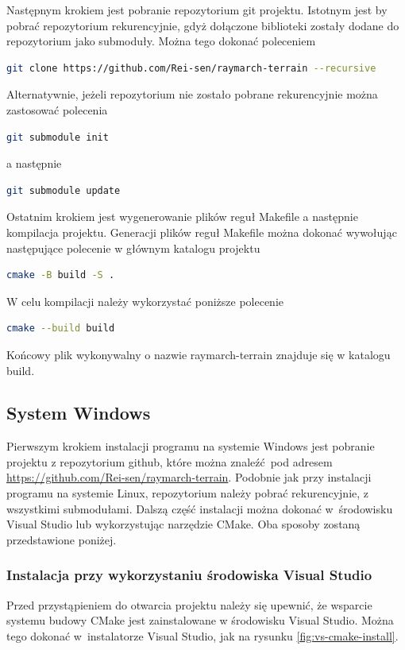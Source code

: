 Następnym krokiem jest pobranie repozytorium git projektu. Istotnym jest by pobrać repozytorium rekurencyjnie, gdyż dołączone biblioteki zostały dodane do repozytorium jako submoduły. Można tego dokonać poleceniem
\begin{lstlisting}[language=bash]
  git clone https://github.com/Rei-sen/raymarch-terrain --recursive
\end{lstlisting}
Alternatywnie, jeżeli repozytorium nie zostało pobrane rekurencyjnie można zastosować polecenia
\begin{lstlisting}[language=bash]
  git submodule init
\end{lstlisting}
a następnie
\begin{lstlisting}[language=bash]
  git submodule update
\end{lstlisting}
Ostatnim krokiem jest wygenerowanie plików reguł Makefile a następnie
kompilacja projektu. Generacji plików reguł Makefile można dokonać wywołując następujące polecenie w głównym katalogu projektu
\begin{lstlisting}[language=bash]
  cmake -B build -S .
\end{lstlisting}
W celu kompilacji należy wykorzystać poniższe polecenie
\begin{lstlisting}[language=bash]
  cmake --build build
\end{lstlisting}
Końcowy plik wykonywalny o nazwie raymarch-terrain znajduje się w katalogu build.
\subsection{System Windows}
Pierwszym krokiem instalacji programu na systemie Windows jest pobranie
projektu z repozytorium github, które można znaleźć pod adresem
\url{https://github.com/Rei-sen/raymarch-terrain}. Podobnie jak przy instalacji programu na systemie Linux, repozytorium należy pobrać rekurencyjnie, z wszystkimi submodułami.
Dalszą część instalacji można dokonać w~środowisku Visual Studio lub
wykorzystując narzędzie CMake. Oba sposoby zostaną przedstawione poniżej.
\subsubsection{Instalacja przy wykorzystaniu środowiska Visual Studio}
Przed przystąpieniem do otwarcia projektu należy się upewnić, że
wsparcie systemu budowy CMake jest zainstalowane w środowisku Visual Studio.
Można tego dokonać w~instalatorze Visual Studio, jak na rysunku \ref{fig:vs-cmake-install}.

